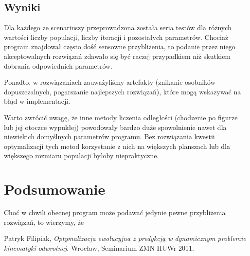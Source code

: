 \documentclass[11pt, leqno]{article}
\begin{document}
\subsection{Wyniki}

Dla każdego ze scenariuszy przeprowadzona została seria testów dla różnych wartości liczby populacji, liczby iteracji i pozostałych parametrów. Chociaż program znajdował często dość sensowne przybliżenia, to podanie przez niego akceptowalnych rozwiązań zdawało się być raczej przypadkiem niż skutkiem dobrania odpowiednich parametrów.

Ponadto, w rozwiązaniach zauważyliśmy artefakty (znikanie osobników dopuszczalnych, pogarszanie najlepszych rozwiązań), które mogą wskazywać na błąd w implementacji.

Warto zwrócić uwagę, że inne metody liczenia odległości (chodzenie po figurze lub jej otoczce wypukłej) powodowały bardzo duże spowolnienie nawet dla niewiekich domyślnych parametrów programu.  Bez rozwiązania kwestii optymalizacji tych metod korzystanie z nich na większych planszach lub dla większego rozmiaru populacji byłoby niepraktyczne.

\section{Podsumowanie}

Choć w chwili obecnej program może podawać jedynie pewne przybliżenia rozwiązań, to wierzymy, że


\begin{thebibliography}{1}
	 Patryk Filipiak, {\it Optymalizacja ewolucyjna z predykcją w dynamicznym problemie kinematyki odwrotnej}. Wrocław, Seminarium ZMN IIUWr 2011.
\end{thebibliography}
\end{document}
